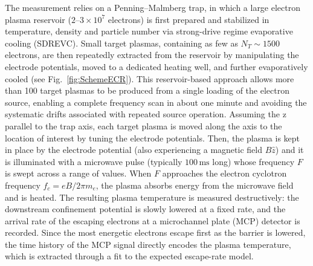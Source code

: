 The measurement relies on a Penning--Malmberg trap, in which a large electron plasma reservoir ($2$--$3\times10^{7}$ electrons) is first prepared and stabilized in temperature, density and particle number via strong-drive regime evaporative cooling (SDREVC). Small target plasmas, containing as few as $N_T \sim 1500$ electrons, are then repeatedly extracted from the reservoir by manipulating the electrode potentials, moved to a dedicated heating well, and further evaporatively cooled (see Fig.~\ref{fig:SchemeECR}). This reservoir-based approach allows more than 100 target plasmas to be produced from a single loading of the electron source, enabling a complete frequency scan in about one minute and avoiding the systematic drifts associated with repeated source operation.
Assuming the z parallel to the trap axis, each target plasma is moved along the axis to the location of interest by tuning the electrode potentials. Then, the plasma is kept in place by the electrode potential (also experiencing a magnetic field $B\hat{z}$) and it is illuminated with a microwave pulse (typically $100\,\mathrm{ms}$ long) whose frequency $F$ is swept across a range of values. When $F$ approaches the electron cyclotron frequency $f_c = eB/2\pi m_e$, the plasma absorbs energy from the microwave field and is heated. The resulting plasma temperature is measured destructively: the downstream confinement potential is slowly lowered at a fixed rate, and the arrival rate of the escaping electrons at a microchannel plate (MCP) detector is recorded. Since the most energetic electrons escape first as the barrier is lowered, the time history of the MCP signal directly encodes the plasma temperature, which is extracted through a fit to the expected escape-rate model.

